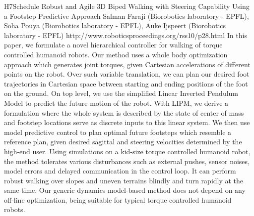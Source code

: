 \begin{spacing}{1.0}
\descriptionPaper
{H7}{Schedule}
{	
Robust and Agile 3D Biped Walking with Steering Capability Using a Footstep Predictive Approach 
}
{
Salman Faraji (Biorobotics laboratory - EPFL), Soha Pouya (Biorobotics laboratory - EPFL), Auke Ijspeert (Biorobotics laboratory - EPFL)
}
{
http://www.roboticsproceedings.org/rss10/p28.html
}
{
In this paper, we formulate a novel hierarchical controller for walking of torque controlled humanoid robots. Our method uses a whole body optimization approach which generates joint torques, given Cartesian accelerations of different points on the robot. Over such variable translation, we can plan our desired foot trajectories in Cartesian space between starting and ending positions of the foot on the ground. On top level, we use the simplified Linear Inverted Pendulum Model to predict the future motion of the robot. With LIPM, we derive a formulation where the whole system is described by the state of center of mass and footstep locations serve as discrete inputs to this linear system. We then use model predictive control to plan optimal future footsteps which resemble a reference plan, given desired sagittal and steering velocities determined by the high-end user. Using simulations on a kid-size torque controlled humanoid robot, the method tolerates various disturbances such as external pushes, sensor noises, model errors and delayed communication in the control loop. It can perform robust walking over slopes and uneven terrains blindly and turn rapidly at the same time. Our generic dynamics model-based method does not depend on any off-line optimization, being suitable for typical torque controlled humanoid robots.
}




\end{spacing}

